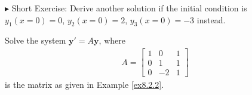$\blacktriangleright$ Short Exercise: Derive another solution if the initial condition is $y_1(x=0) = 0$, $y_2(x=0) = 2$, $y_3(x=0) = -3$ instead.\footnotemark

\begin{exmp}
\label{exmp:solveODEsystemcomplex}
Solve the system $\textbf{y}' = A\textbf{y}$, where
\begin{align*}
A = 
\begin{bmatrix}
1 & 0 & 1 \\
0 & 1 & 1 \\
0 & -2 & 1
\end{bmatrix}   
\end{align*}
is the matrix as given in Example \ref{ex8.2.2}.
\end{exmp}
